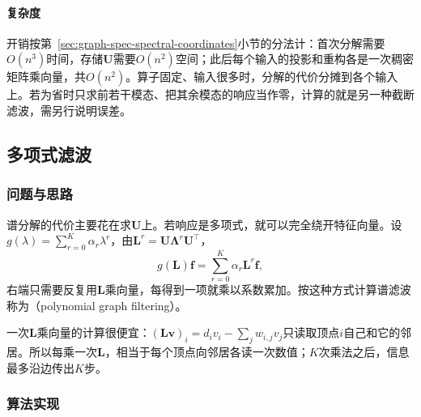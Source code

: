 \paragraph{复杂度}
开销按第~\ref{sec:graph-spec-spectral-coordinates}小节的分法计：首次分解需要$O(n^3)$时间，存储$\bm U$需要$O(n^2)$空间；此后每个输入的投影和重构各是一次稠密矩阵乘向量，共$O(n^2)$。算子固定、输入很多时，分解的代价分摊到各个输入上。若为省时只求前若干模态、把其余模态的响应当作零，计算的就是另一种截断滤波，需另行说明误差。

\subsection{多项式滤波}
\label{sec:graph-spec-polynomial-filter}

\subsubsection{问题与思路}

谱分解的代价主要花在求$\bm U$上。若响应是多项式，就可以完全绕开特征向量。设$g(\lambda)=\sum_{r=0}^K\alpha_r\lambda^r$，由$\bm L^r=\bm U\bm\Lambda^r\bm U^{\top}$，
\begin{equation}
 g(\bm L)\bm f=\sum_{r=0}^K\alpha_r\bm L^r\bm f ,
 \label{eq:graph-spec-polynomial-filter}
\end{equation}
右端只需要反复用$\bm L$乘向量，每得到一项就乘以系数累加。按这种方式计算谱滤波称为（polynomial graph filtering）。

一次$\bm L$乘向量的计算很便宜：$(\bm L\bm v)_i=d_iv_i-\sum_jw_{i,j}v_j$只读取顶点$i$自己和它的邻居。所以每乘一次$\bm L$，相当于每个顶点向邻居各读一次数值；$K$次乘法之后，信息最多沿边传出$K$步。

\subsubsection{算法实现}

